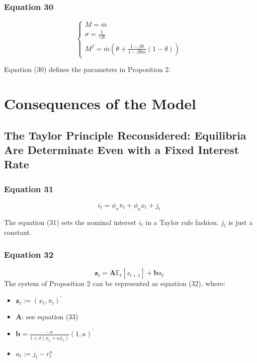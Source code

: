 \documentclass{article}
\begin{document}
\subsubsection*{Equation 30}
\begin{equation}\tag{30}
    \begin{cases}
        M=\bar{m} \\
        \sigma=\frac{1}{\gamma R} \\
        M^{f}=\bar{m}\left(\theta+\frac{1-\beta\theta}{1-\beta\theta\bar{m}}(1-\theta)\right)
    \end{cases}
\end{equation}

Equation (30) defines the parameters in Proposition 2.

\section{Consequences of the Model}

\subsection{The Taylor Principle Reconsidered: Equilibria Are Determinate Even with a Fixed Interest Rate}

\subsubsection*{Equation 31}
\begin{equation}\tag{31}
    i_{t}=\phi_{\pi} \pi_{t}+\phi_{x}x_{t}+j_{t}
\end{equation}

The equation (31) sets the nominal interest $i_{t}$ in a Taylor rule fashion. $j_{t}$ is just a constant.

\subsubsection*{Equation 32}
\begin{equation}\tag{32}
\textbf{z}_{t}=\textbf{A}\mathbb{E}_{t}\left[z_{t+1}\right]+\textbf{b}a_{t}
\end{equation}
The system of Proposition 2 can be represented as equation (32), where:
\begin{itemize}
    \item $\textbf{z}_{t}:=(x_{t},\pi_{t})^{\prime}$
    \item $\textbf{A}$: see equation (33)
    \item $\textbf{b}=\frac{-\sigma}{1+\sigma(\phi_{x}+\kappa\phi_{\pi})}(1,\kappa)^{\prime}$
    \item $a_{t}:=j_{t}-r_{t}^{n}$
\end{itemize}
\end{document}
